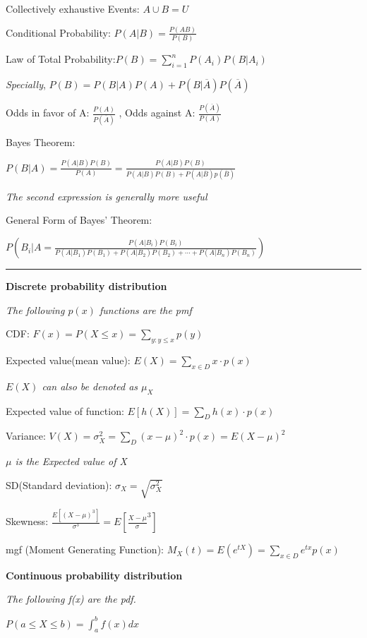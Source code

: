 \documentclass{article}
\newcommand{\sectionline}{\color{black}\rule[2pt]{0.45\textwidth}{0.05em}\color{black}}
\newcommand{\bigtitle}[1]{
	\noindent
	\textbf{#1}
}
\begin{document}
	Collectively exhaustive Events: $A \cup B = U$
	
	Conditional Probability: $P(A|B) = \frac{P(AB)}{P(B)}$
	
	Law of Total Probability:$P(B) = \sum \limits_{i=1}^{n}P(A_i)P(B|A_i)$
	
	\textit{Specially}, $P(B) = P(B|A)P(A)+P(B|\overline{A})P(\overline{A})$
	
	Odds in favor of A: $\frac{P(A)}{P(\overline{A})}$
	, 
	Odds against A: $\frac{P(\overline{A})}{P(A)}$
	
	Bayes Theorem:
	
	$P(B|A) = \frac{P(A|B)P(B)}{P(A)} = \frac{P(A|B)P(B)}{P(A|B)P(B)+P(A|\overline{B})p(\overline{B})}$
	
	\textit{The second expression is generally more useful}
	
	General Form of Bayes' Theorem:
	
	$P(B_i|A = \frac{P(A|B_i)P(B_i)}{P(A|B_1)P(B_1)+P(A|B_2)P(B_2)+\cdots+P(A|B_n)P(B_n)})$
	
	\sectionline
	
	
	
	
	\bigtitle{Discrete probability distribution}
	
	\textit{The following $p(x)$ functions are the pmf}
	
	CDF: $F(x) = P(X\leq x)=\sum \limits_{y:y\leq x}p(y)$
	
	Expected value(mean value): $E(X) = \sum \limits_{x\in D}x \cdot p(x)$
	
	\textit{$E(X)$ can also be denoted as $\mu_X$}
	
	Expected value of function: $E[h(X)] = \sum_Dh(x)\cdot p(x)$
	
	Variance: $V(X) =\sigma_X^2 =  \sum_{D}(x-\mu)^2\cdot p(x) = E(X-\mu)^2$
	
	\textit{$\mu$ is the Expected value of X}
	
	SD(Standard deviation): $\sigma_X = \sqrt{\sigma_X^2}$
	
	Skewness: $\frac{E[(X-\mu)^3]}{\sigma^3} = E[\frac{X-\mu}{\sigma}^3]$
	
	mgf (Moment Generating Function): $M_X(t) = E(e^{tX}) = \sum \limits_{x\in D}e^{tx}p(x)$
	
	
	
	
	
	\bigtitle{Continuous probability distribution}
	
	\textit{The following f(x) are the pdf.}
	
	$P(a\leq X\leq b) = \int_{a}^{b} f(x)dx $
	
\end{document}
